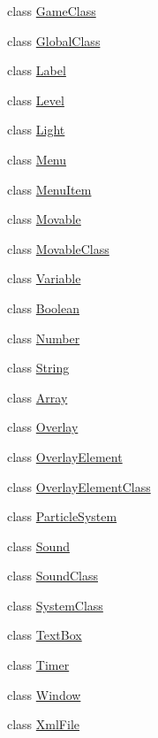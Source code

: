 \begin{DoxyCompactItemize}
\item 
class \hyperlink{class_rad_xml_1_1_game_class}{Game\-Class}
\item 
class \hyperlink{class_rad_xml_1_1_global_class}{Global\-Class}
\item 
class \hyperlink{class_rad_xml_1_1_label}{Label}
\item 
class \hyperlink{class_rad_xml_1_1_level}{Level}
\item 
class \hyperlink{class_rad_xml_1_1_light}{Light}
\item 
class \hyperlink{class_rad_xml_1_1_menu}{Menu}
\item 
class \hyperlink{class_rad_xml_1_1_menu_item}{Menu\-Item}
\item 
class \hyperlink{class_rad_xml_1_1_movable}{Movable}
\item 
class \hyperlink{class_rad_xml_1_1_movable_class}{Movable\-Class}
\item 
class \hyperlink{class_rad_xml_1_1_variable}{Variable}
\item 
class \hyperlink{class_rad_xml_1_1_boolean}{Boolean}
\item 
class \hyperlink{class_rad_xml_1_1_number}{Number}
\item 
class \hyperlink{class_rad_xml_1_1_string}{String}
\item 
class \hyperlink{class_rad_xml_1_1_array}{Array}
\item 
class \hyperlink{class_rad_xml_1_1_overlay}{Overlay}
\item 
class \hyperlink{class_rad_xml_1_1_overlay_element}{Overlay\-Element}
\item 
class \hyperlink{class_rad_xml_1_1_overlay_element_class}{Overlay\-Element\-Class}
\item 
class \hyperlink{class_rad_xml_1_1_particle_system}{Particle\-System}
\item 
class \hyperlink{class_rad_xml_1_1_sound}{Sound}
\item 
class \hyperlink{class_rad_xml_1_1_sound_class}{Sound\-Class}
\item 
class \hyperlink{class_rad_xml_1_1_system_class}{System\-Class}
\item 
class \hyperlink{class_rad_xml_1_1_text_box}{Text\-Box}
\item 
class \hyperlink{class_rad_xml_1_1_timer}{Timer}
\item 
class \hyperlink{class_rad_xml_1_1_window}{Window}
\item 
class \hyperlink{class_rad_xml_1_1_xml_file}{Xml\-File}
\end{DoxyCompactItemize}
